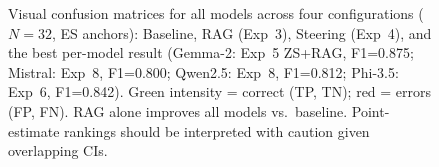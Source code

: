 \documentclass{ieeeaccess}
\begin{document}
\begin{figure}[htbp]
{
}%
\caption{Visual confusion matrices for all models across four configurations ($N=32$, ES anchors): Baseline, RAG (Exp~3), Steering (Exp~4), and the best per-model result (Gemma-2: Exp~5 ZS+RAG, F1=0.875; Mistral: Exp~8, F1=0.800; Qwen2.5: Exp~8, F1=0.812; Phi-3.5: Exp~6, F1=0.842). Green intensity = correct (TP, TN); red = errors (FP, FN). RAG alone improves all models vs.\ baseline. Point-estimate rankings should be interpreted with caution given overlapping CIs.}
\label{fig:confusion_matrices}
\end{figure}
\end{document}

